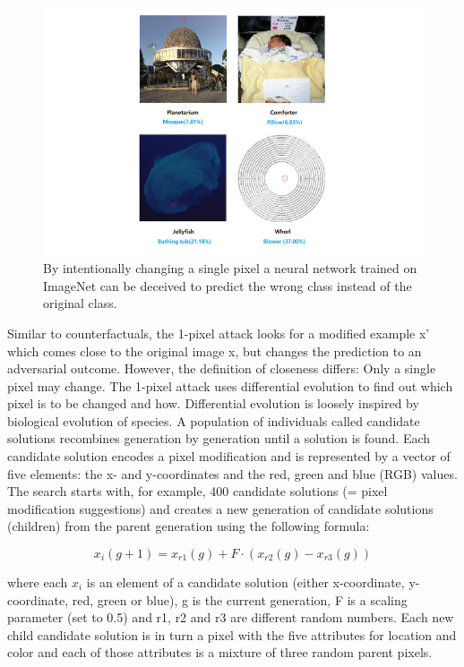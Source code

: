 \documentclass[12pt,]{krantz}
\begin{document}
\begin{figure}

{\centering \includegraphics[width=\textwidth]{images/adversarial-1pixel} 

}

\caption{By intentionally changing a single pixel a neural network trained on ImageNet can be deceived to predict the wrong class instead of the original class.}\label{fig:adversarial-1pixel}
\end{figure}

Similar to counterfactuals, the 1-pixel attack looks for a modified
example x' which comes close to the original image x, but changes the
prediction to an adversarial outcome. However, the definition of
closeness differs: Only a single pixel may change. The 1-pixel attack
uses differential evolution to find out which pixel is to be changed and
how. Differential evolution is loosely inspired by biological evolution
of species. A population of individuals called candidate solutions
recombines generation by generation until a solution is found. Each
candidate solution encodes a pixel modification and is represented by a
vector of five elements: the x- and y-coordinates and the red, green and
blue (RGB) values. The search starts with, for example, 400 candidate
solutions (= pixel modification suggestions) and creates a new
generation of candidate solutions (children) from the parent generation
using the following formula:

\[x_{i}(g+1)=x_{r1}(g)+F\cdot(x_{r2}(g)-x_{r3}(g))\]

where each \(x_i\) is an element of a candidate solution (either
x-coordinate, y-coordinate, red, green or blue), g is the current
generation, F is a scaling parameter (set to 0.5) and r1, r2 and r3 are
different random numbers. Each new child candidate solution is in turn a
pixel with the five attributes for location and color and each of those
attributes is a mixture of three random parent pixels.
\end{document}

